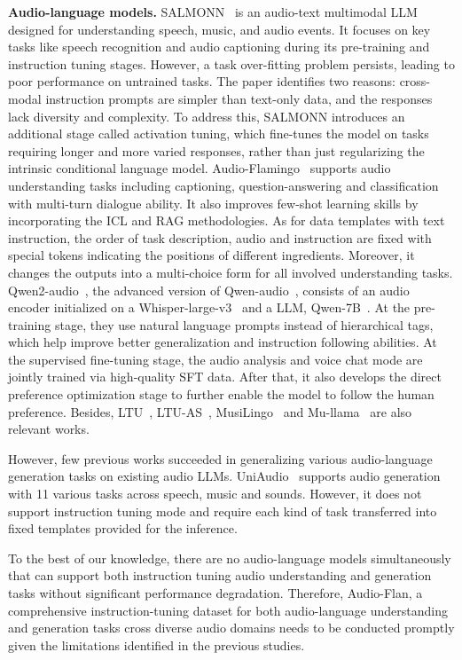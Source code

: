 \textbf{Audio-language models.}
SALMONN~\citep{tang2023salmonn} is an audio-text multimodal LLM designed for understanding speech, music, and audio events. It focuses on key tasks like speech recognition and audio captioning during its pre-training and instruction tuning stages. However, a task over-fitting problem persists, leading to poor performance on untrained tasks. The paper identifies two reasons: cross-modal instruction prompts are simpler than text-only data, and the responses lack diversity and complexity. To address this, SALMONN introduces an additional stage called activation tuning, which fine-tunes the model on tasks requiring longer and more varied responses, rather than just regularizing the intrinsic conditional language model.  
Audio-Flamingo~\citep{kong2024audioflamingonovelaudio} supports audio understanding tasks including captioning, question-answering and classification with multi-turn dialogue ability. It also improves few-shot learning skills by incorporating the ICL and RAG methodologies. 
As for data templates with text instruction, the order of task description, audio and instruction are fixed with special tokens indicating the positions of different ingredients. Moreover, it changes the outputs into a multi-choice form for all involved understanding tasks.
Qwen2-audio~\citep{chu2024qwen2}, the advanced version of Qwen-audio~\citep{chu2023qwen}, consists of an audio encoder initialized on a Whisper-large-v3~\citep{radford2022robustspeechrecognitionlargescale} and a LLM, Qwen-7B~\citep{bai2023qwen}. At the pre-training stage, they use natural language prompts instead of hierarchical tags, which help improve better generalization and instruction following abilities. At the supervised fine-tuning stage, the audio analysis and voice chat mode are jointly trained via high-quality SFT data. After that, it also develops the direct preference optimization stage to further enable the model to follow the human preference. Besides, LTU~\citep{gong2023listen}, LTU-AS~\citep{gong2023joint}, MusiLingo~\citep{deng2023musilingo} and Mu-llama~\citep{liu2024mullama} are also relevant works.

However, few previous works succeeded in generalizing various audio-language generation tasks on existing audio LLMs. UniAudio~\citep{yang2023uniaudio} supports audio generation with 11 various tasks across speech, music and sounds. However, it does not support instruction tuning mode and require each kind of task transferred into fixed templates provided for the inference.

To the best of our knowledge, there are no audio-language models simultaneously that can support both instruction tuning audio understanding and generation tasks without significant performance degradation. Therefore, Audio-Flan, a comprehensive instruction-tuning dataset for both audio-language understanding and generation tasks cross diverse audio domains needs to be conducted promptly given the limitations identified in the previous studies.


